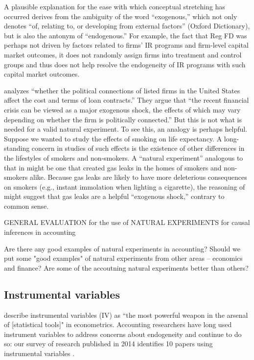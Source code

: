 \documentclass[11pt]{amsart}
\begin{document}
A plausible explanation for the ease with which conceptual stretching has occurred derives from the ambiguity of the word ``exogenous,'' which not only denotes  ``of, relating to, or developing from external factors'' (Oxford Dictionary), but is also the antonym of ``endogenous.''
For example, the fact that Reg FD was perhaps not driven by factors related to firms' IR programs and firm-level capital market outcomes, it does not randomly assign firms into treatment and control groups and thus does not help resolve the endogeneity of IR programs with such capital market outcomes.

\cite{Houston:2014hv} analyzes ``whether the political connections of listed firms in the United States affect the cost and terms of loan contracts.'' They argue that ``the recent financial crisis can be viewed as a major exogenous shock, the effects of which may vary depending on whether the firm is politically connected.'' But this is not what is needed for a valid natural experiment. To see this, an analogy is perhaps helpful. Suppose we wanted to study the effects of smoking on life expectancy. A long-standing concern in studies of such effects is the existence of other differences in the lifestyles of smokers and non-smokers. A ``natural experiment'' analogous to that in \cite{Houston:2014hv} might be one that created gas leaks in the homes of smokers and non-smokers alike. Because gas leaks are likely to have more deleterious consequences on smokers (e.g., instant immolation when lighting a cigarette), the reasoning of \cite{Houston:2014hv} might suggest that gas leaks are a helpful ``exogenous shock,'' contrary to common sense. %


GENERAL EVALUATION for the use of NATURAL EXPERIMENTS for causal inferences in accounting 

Are there any good examples of natural experiments in accounting?  Should we put some "good examples" of natural experiments from other areas -- economics and finance?  Are some of the accoutning natural experiments better than others?

\subsection{Instrumental variables}
\citet[p.114]{Angrist:2008vk} describe instrumental variables (IV) as ``the most powerful weapon in the arsenal of [statistical tools]" in econometrics. 
Accounting researchers have long used instrument variables to address concerns about endogeneity \citep{Larcker:2010fq} and continue to do so: our survey of research published in 2014 identifies 10 papers using instrumental variables \citep{Cannon:2014im,Cohen:2014jl,Kim:2014fm,Vermeer:2014bs,Fox:2014io,Guedhami:2013cj,Houston:2014hv,deFranco:2014ct,Erkens:2014hj,Correia:2014fp}. 
\end{document}
